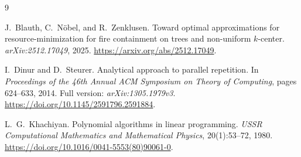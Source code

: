 \documentclass[11pt]{article}
\numberwithin{equation}{section}
\theoremstyle{definition}
\begin{document}
\begin{thebibliography}{9}

J.~Blauth, C.~N\"obel, and R.~Zenklusen.
\newblock Toward optimal approximations for resource-minimization for
fire containment on trees and non-uniform $k$-center.
\newblock \emph{arXiv:2512.17049}, 2025.
\newblock \url{https://arxiv.org/abs/2512.17049}.

I.~Dinur and D.~Steurer.
\newblock Analytical approach to parallel repetition.
\newblock In \emph{Proceedings of the 46th Annual ACM Symposium on
Theory of Computing}, pages 624--633, 2014.
\newblock Full version: \emph{arXiv:1305.1979v3}.
\newblock \url{https://doi.org/10.1145/2591796.2591884}.

L.~G.~Khachiyan.
\newblock Polynomial algorithms in linear programming.
\newblock \emph{USSR Computational Mathematics and Mathematical Physics},
20(1):53--72, 1980.
\newblock \url{https://doi.org/10.1016/0041-5553(80)90061-0}.

\end{thebibliography}
\end{document}
